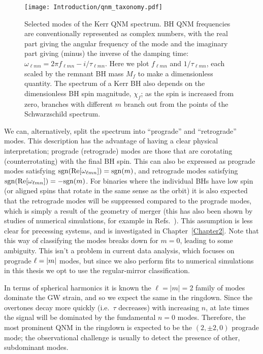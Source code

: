 \begin{figure}[t]
    \centering
    \texttt{[image: Introduction/qnm\_taxonomy.pdf]}
    \caption[The Kerr quasinormal mode spectrum]{ 
    Selected modes of the Kerr QNM spectrum. BH QNM frequencies are conventionally represented as complex numbers, with the real part giving the  angular frequency of the mode and the imaginary part giving (minus) the inverse of the damping time: $\omega_{\ell m n} = 2\pi f_{\ell m n} - i/\tau_{\ell m n}$. Here we plot $f_{\ell m n}$ and $1/\tau_{\ell m n}$, each scaled by the remnant BH mass $M_f$ to make a dimensionless quantity. The spectrum of a Kerr BH also depends on the dimensionless BH spin magnitude, $\chi_f$; as the spin is increased from zero, branches with different $m$ branch out from the points of the Schwarzschild spectrum.
    }
    \label{ch1:fig:qnm_taxonomy}
\end{figure}

We can, alternatively, split the spectrum into ``prograde'' and ``retrograde'' modes. 
This description has the advantage of having a clear physical interpretation; prograde (retrograde) modes are those that are corotating (counterrotating) with the final BH spin.
This can also be expressed as prograde modes satisfying $\mathrm{sgn}\qty(\Re[\omega_{\ell m n}]) = \mathrm{sgn}\qty(m)$, and retrograde modes satisfying $\mathrm{sgn}\qty(\Re[\omega_{\ell m n}]) = -\mathrm{sgn}\qty(m)$.
For binaries where the individual BHs have low spin (or aligned spins that rotate in the same sense as the orbit) it is also expected that the retrograde modes will be suppressed compared to the prograde modes, which is simply a result of the geometry of merger (this has also been shown by studies of numerical simulations, for example in Refs.~\cite{Berti:2005ys, London:2014cma, JimenezForteza:2020cve}).
This assumption is less clear for precessing systems, and is investigated in Chapter~\ref{Chapter2}.
Note that this way of classifying the modes breaks down for $m=0$, leading to some ambiguity. 
This isn't a problem in current data analysis, which focuses on prograde $\ell = \abs{m}$ modes, but since we also perform fits to numerical simulations in this thesis we opt to use the regular-mirror classification.

In terms of spherical harmonics it is known the $\ell=|m|=2$ family of modes dominate the GW strain, and so we expect the same in the ringdown.
Since the overtones decay more quickly (i.e.\ $\tau$ decreases) with increasing $n$, at late times the signal will be dominated by the fundamental $n=0$ modes. 
Therefore, the most prominent QNM in the ringdown is expected to be the $(2,\pm 2,0)$ prograde mode; the observational challenge is usually to detect the presence of other, subdominant modes.

